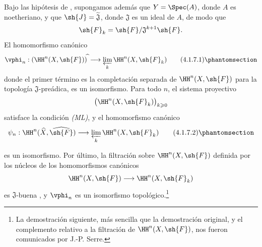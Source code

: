 \documentclass[oneside]{amsart}
\renewcommand{\geq}{\geqslant}
\newcommand{\oldpage}[2][]{{\marginnote{\normalfont\textbf{#1}~|~#2}}\ignorespaces}
\let\EGAOriginalLabel\label
\renewcommand{\label}[1]{\phantomsection\EGAOriginalLabel{#1}}
\begin{document}
\begin{corollary}[4.1.7]
\label{III.4.1.7}
Bajo las hipótesis de \textup{}, supongamos además que
$Y=\Spec(A)$, donde $A$ es noetheriano, y que
$\sh{J}=\widetilde{\mathfrak{J}}$, donde $\mathfrak{J}$ es un ideal
de $A$, de modo que
\[
  \sh{F}_k=\sh{F}/\mathfrak{J}^{k+1}\sh{F}.
\]
El homomorfismo canónico
\[
  \vphi_n:
  (\HH^n(X,\sh{F}))^{\widehat{\,}}
  \longrightarrow
  \varprojlim_k\HH^n(X,\sh{F}_k)
  \tag{4.1.7.1}
  \label{III.4.1.7.1}
\]
donde el primer término es la completación separada de
$\HH^n(X,\sh{F})$ para la topología $\mathfrak{J}$-preádica, es un
isomorfismo.
Para todo $n$, el sistema proyectivo
\[
  \bigl(\HH^n(X,\sh{F}_k)\bigr)_{k\geq0}
\]
satisface la condición \emph{(ML)}, y el homomorfismo canónico
\[
  \psi_n:
  \HH^n(\widehat{X},\widehat{\sh{F}})
  \longrightarrow
  \varprojlim_k\HH^n(X,\sh{F}_k)
  \tag{4.1.7.2}
  \label{III.4.1.7.2}
\]

\oldpage[III]{126}

es un isomorfismo.
Por último, la filtración sobre $\HH^n(X,\sh{F})$ definida por los
núcleos de los homomorfismos canónicos
\[
  \HH^n(X,\sh{F})\longrightarrow\HH^n(X,\sh{F}_k)
\]
es $\mathfrak{J}$-buena \textup{}, y $\vphi_n$ es un
isomorfismo topológico.\footnote{La demostración siguiente, más sencilla
que la demostración original, y el complemento relativo a la filtración
de $\HH^n(X,\sh{F})$, nos fueron comunicados por J.-P. Serre.}
\end{corollary}
\end{document}
